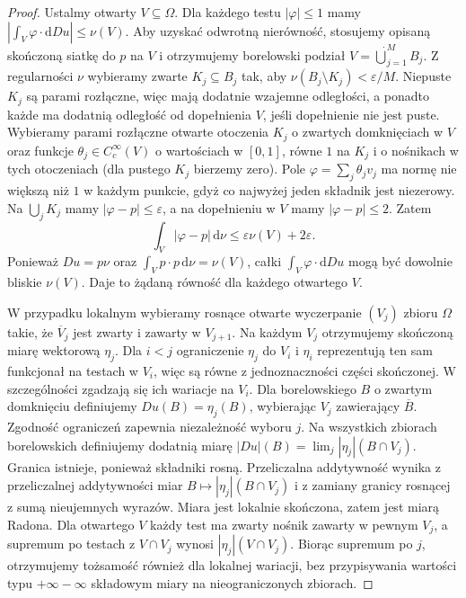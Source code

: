 \begin{proof}
Ustalmy otwarty $V\subseteq\Omega$.
Dla każdego testu $|\varphi|\le1$ mamy
$|\int_V\varphi\cdot\mathrm dDu|\le\nu(V)$.
Aby uzyskać odwrotną nierówność, stosujemy opisaną
skończoną siatkę do $p$ na $V$ i otrzymujemy
borelowski podział $V=\dot\bigcup_{j=1}^M B_j$.
Z regularności $\nu$ wybieramy zwarte
$K_j\subseteq B_j$ tak, aby
$\nu(B_j\setminus K_j)<\varepsilon/M$.
Niepuste $K_j$ są parami rozłączne, więc mają
dodatnie wzajemne odległości, a ponadto każde
ma dodatnią odległość od dopełnienia $V$,
jeśli dopełnienie nie jest puste.
Wybieramy parami rozłączne otwarte otoczenia
$K_j$ o zwartych domknięciach w $V$ oraz
funkcje $\theta_j\in C_c^\infty(V)$ o wartościach
w $[0,1]$, równe $1$ na $K_j$ i o nośnikach
w tych otoczeniach (dla pustego $K_j$ bierzemy zero).
Pole $\varphi=\sum_j\theta_j v_j$ ma normę nie
większą niż $1$ w każdym punkcie, gdyż co najwyżej
jeden składnik jest niezerowy. Na $\bigcup_j K_j$
mamy $|\varphi-p|\le\varepsilon$, a na dopełnieniu
w $V$ mamy $|\varphi-p|\le2$. Zatem
\[
 \int_V|\varphi-p|\,\mathrm d\nu
 \le\varepsilon\nu(V)+2\varepsilon.
\]
Ponieważ $Du=p\nu$ oraz $\int_V p\cdot p\,\mathrm d\nu
=\nu(V)$, całki $\int_V\varphi\cdot\mathrm dDu$
mogą być dowolnie bliskie $\nu(V)$.
Daje to żądaną równość dla każdego otwartego $V$.

W przypadku lokalnym wybieramy rosnące otwarte
wyczerpanie $(V_j)$ zbioru $\Omega$ takie, że
$\overline V_j$ jest zwarty i zawarty w $V_{j+1}$.
Na każdym $V_j$ otrzymujemy skończoną miarę
wektorową $\eta_j$. Dla $i<j$ ograniczenie
$\eta_j$ do $V_i$ i $\eta_i$ reprezentują ten
sam funkcjonał na testach w $V_i$, więc są równe
z jednoznaczności części skończonej. W szczególności
zgadzają się ich wariacje na $V_i$.
Dla borelowskiego $B$ o zwartym domknięciu
definiujemy $Du(B)=\eta_j(B)$, wybierając
$V_j$ zawierający $\overline B$. Zgodność
ograniczeń zapewnia niezależność wyboru $j$.
Na wszystkich zbiorach borelowskich definiujemy
dodatnią miarę
$|Du|(B)=\lim_j|\eta_j|(B\cap V_j)$.
Granica istnieje, ponieważ składniki rosną.
Przeliczalna addytywność wynika z przeliczalnej
addytywności miar $B\mapsto|\eta_j|(B\cap V_j)$
i z zamiany granicy rosnącej z sumą
nieujemnych wyrazów. Miara jest lokalnie skończona,
zatem jest miarą Radona. Dla otwartego $V$
każdy test ma zwarty nośnik zawarty w pewnym $V_j$,
a supremum po testach z $V\cap V_j$ wynosi
$|\eta_j|(V\cap V_j)$. Biorąc supremum po $j$,
otrzymujemy tożsamość również dla lokalnej wariacji,
bez przypisywania wartości typu $+\infty-\infty$
składowym miary na nieograniczonych zbiorach.
\end{proof}

